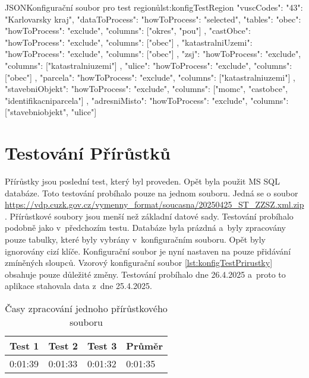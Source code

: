 \begin{code}{JSON}{Konfigurační soubor pro test regionů}{lst:konfigTestRegion}
  {
    "vuscCodes": {"43": "Karlovarsky kraj"},
    "dataToProcess": {
      "howToProcess": "selected",
      "tables": {
        "obec": {
          "howToProcess": "exclude",
          "columns": ["okres", "pou"]
        },
        "castObce": {
          "howToProcess": "exclude",
          "columns": ["obec"]
        },
        "katastralniUzemi": {
          "howToProcess": "exclude",
          "columns": ["obec"]
        },
        "zsj": {
          "howToProcess": "exclude",
          "columns": ["katastralniuzemi"]
        },
        "ulice": {
          "howToProcess": "exclude",
          "columns": ["obec"]
        },
        "parcela": {
          "howToProcess": "exclude",
          "columns": ["katastralniuzemi"]
        },
        "stavebniObjekt": {
          "howToProcess": "exclude",
          "columns": ["momc", "castobce", "identifikacniparcela"]
        },
        "adresniMisto": {
          "howToProcess": "exclude",
          "columns": ["stavebniobjekt", "ulice"]
        }
      }
    }
  }
\end{code}

\newpage

\section{Testování Přírůstků}
Přírůstky jsou poslední test, který byl proveden.
Opět byla použit MS SQL databáze. Toto testování probíhalo pouze na jednom souboru.
Jedná se o soubor \url{https://vdp.cuzk.gov.cz/vymenny_format/soucasna/20250425_ST_ZZSZ.xml.zip}.
Přírůstkové soubory jsou menší než základní datové sady.
Testování probíhalo podobně jako v~předchozím testu.
Databáze byla prázdná a~byly zpracovány pouze tabulky, které byly vybrány v~konfiguračním souboru.
Opět byly ignorovány cizí klíče. Konfigurační soubor je nyní nastaven na pouze přidávání zmíněných sloupců.
Vzorový konfigurační soubor \ref{lst:konfigTestPrirustky} obsahuje pouze důležité změny.
Testování probíhalo dne 26.4.2025 a~proto to aplikace stahovala data z~dne 25.4.2025.

\begin{table}[!h]
  \centering
  \caption{Časy zpracování jednoho přírůstkového souboru}
  \label{tab:test3}
  \begin{tabular}{|l|l|l|l|}
  \hline
  \textbf{Test 1} & \textbf{Test 2} & \textbf{Test 3} & \textbf{Průměr} \\ \hline
  0:01:39         & 0:01:33         & 0:01:32         & 0:01:35         \\ \hline
  \end{tabular}
\end{table}

